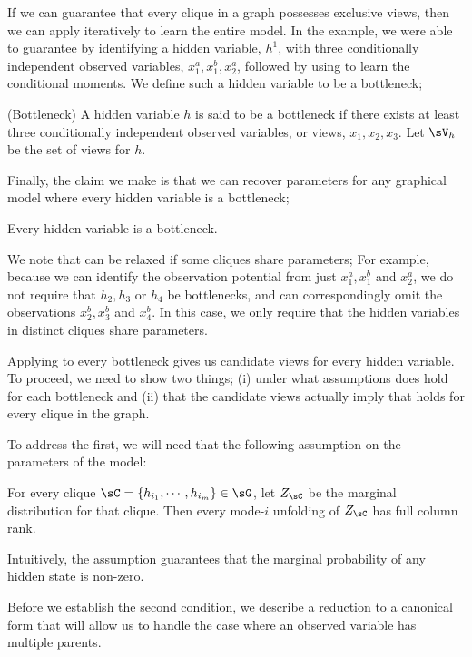 If we can guarantee that every clique in a graph possesses exclusive
  views, then we can apply \LearnClique iteratively to learn the entire
  model.
In the example, we were able to guarantee 
  by identifying a hidden variable, $h^1$, with three conditionally
  independent observed variables, $x^a_1, x^b_1, x^a_2$, followed by
  using \TensorFactorize to learn the conditional moments.
We define such a hidden variable to be a bottleneck;
\begin{definition}(Bottleneck)
  A hidden variable $h$ is said to be a bottleneck if there exists at
    least three conditionally independent observed variables, or views,
    $x_1, x_2, x_3$. 
  Let $\sV_{h}$ be the set of views for $h$.
\end{definition}
Finally, the claim we make is that we can recover parameters for any
  graphical model where every hidden variable is a bottleneck;
\begin{property}
  \label{prop:bottleneck}
  Every hidden variable is a bottleneck.
\end{property}
We note that  can be relaxed if some cliques
  share parameters;
For example, because we can identify the observation potential from just
  $x^a_1, x^b_1$ and $x^a_2$, we do not require that $h_2, h_3$ or $h_4$
  be bottlenecks, and can correspondingly omit the observations $x^b_2,
  x^b_3$ and $x^b_4$.
In this case, we only require that the hidden variables in distinct
  cliques share parameters.

Applying \TensorFactorize to every bottleneck gives us candidate views
  for every hidden variable. 
To proceed, we need to show two things; (i) under what assumptions
  does  hold for each bottleneck and (ii)
  that the candidate views actually imply that 
  holds for every clique in the graph.

To address the first, we will need that the following assumption on the
  parameters of the model:
\begin{assumption} 
  \label{asm:full-rank-plus}
  For every clique $\sC = \{h_{i_1}, \cdots, h_{i_m}\} \in \sG$, let
    $Z_\sC$ be the marginal distribution for that clique. 
  Then every mode-$i$ unfolding of $Z_\sC$ has full column rank.\verify
\end{assumption}
Intuitively, the assumption guarantees that the marginal probability of
  any hidden state is non-zero.

Before we establish the second condition, we describe a reduction to
  a canonical form that will allow us to handle the case where an observed
  variable has multiple parents.


